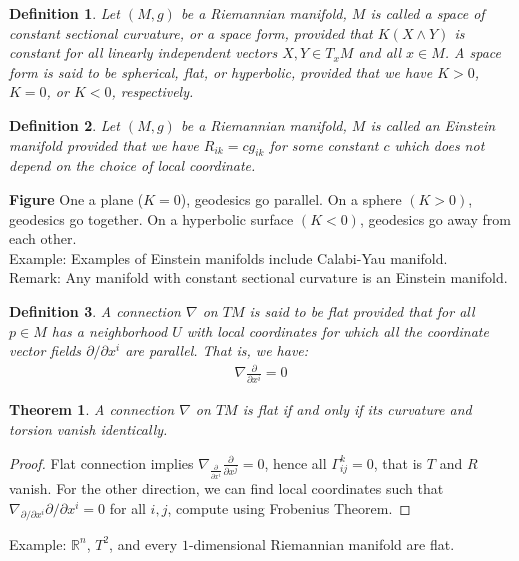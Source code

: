 \documentclass[11pt]{book}
\theoremstyle{break}
\theoremstyle{break}
\newtheorem{thm}{Theorem}[section]
\newtheorem{defn}{Definition}[corL]
\newcommand{\R}{\mathbb{R}}
\newcommand{\pd}{\partial}
\newcommand{\remark}{\color{blue}Remark: \color{black}}
\newcommand{\example}{\color{green}Example: \color{black}}
\begin{document}
\begin{defn}
Let $(M,g)$ be a Riemannian manifold, $M$ is called a space of constant sectional curvature, or a space form, provided that $K(X\wedge Y)$ is constant for all linearly independent vectors $X,Y \in T_xM$ and all $x \in M$. A space form is said to be spherical, flat, or hyperbolic, provided that we have $K>0$, $K =0$, or $K<0$, respectively.   
\end{defn}

\begin{defn}
Let $(M,g)$ be a Riemannian manifold, $M$ is called an Einstein manifold provided that we have $R_{ik} = cg_{ik}$ for some constant $c$ which does not depend on the choice of local coordinate.
\end{defn}

\textbf{Figure} One a plane ($K=0$), geodesics go parallel. On a sphere $(K>0)$, geodesics go together. On a hyperbolic surface $(K<0)$, geodesics go away from each other. \\


\example Examples of Einstein manifolds include Calabi-Yau manifold.\\

\remark Any manifold with constant sectional curvature is an Einstein manifold. \\

\begin{defn}
A connection $\nabla$ on $TM$ is said to be flat provided that for all $p \in M$ has a neighborhood $U$ with local coordinates for which all the coordinate vector fields $\pd/\pd x^i$ are parallel. That is, we have:
\begin{align*}
\nabla \frac{\pd}{\pd x^i} = 0
\end{align*}
\end{defn}

\begin{thm}
A connection $\nabla$ on $TM$ is flat if and only if its curvature and torsion vanish identically. 
\end{thm}
\begin{proof}
Flat connection implies $\nabla_{\frac{\pd}{\pd x^i}} \frac{\pd}{\pd x^j} = 0$, hence all $\Gamma_{ij}^k = 0$, that is $T$ and $R$ vanish. For the other direction, we can find local coordinates such that $\nabla_{\pd/\pd x^i}\pd/\pd x^i = 0 $ for all $i,j$, compute using Frobenius Theorem. 
\end{proof}

\example $\R^n$, $T^2$, and every $1$-dimensional Riemannian manifold are flat. \\
\end{document}
